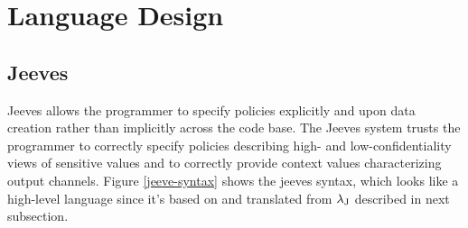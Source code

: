 \section{Language Design}
\label{language}
 \subsection{Jeeves}
 Jeeves allows the programmer to specify policies explicitly and upon data creation rather than implicitly across the code base. The Jeeves system trusts the programmer to correctly specify policies describing high- and low-confidentiality views of sensitive values and to correctly provide context values characterizing output channels. Figure \ref{jeeve-syntax} shows the jeeves syntax, which looks like a high-level language since it's based on and translated from ${\lambda_{\text{J}}}$ described in next subsection.

